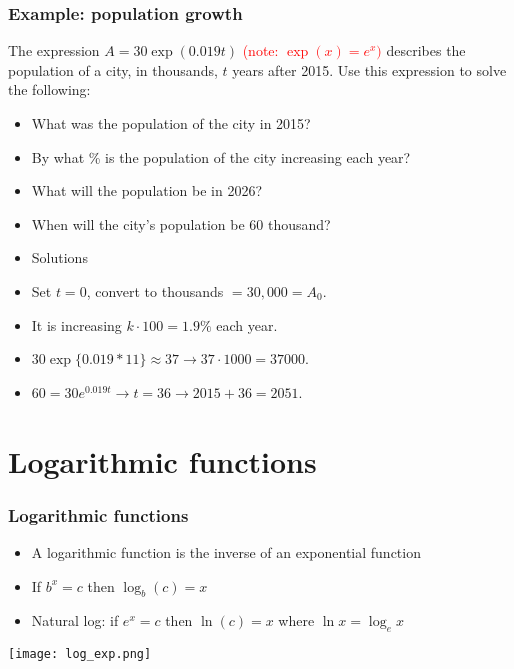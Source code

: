 \documentclass[xcolor=dvipsnames, 9pt]{beamer} %
\begin{document}
\begin{frame}
\frametitle{Example: population growth}


The expression $A=30\exp ( 0.019t )$ \textcolor{red}{(note: $\exp(x) = e^x)$} describes the population of a city, in thousands, $t$ years after 2015.  Use this expression to solve the following:

\begin{itemize}
\item What was the population of the city in 2015?
\item By what \% is the population of the city increasing each year?
\item What will the population be in 2026? 
\item When will the city’s population be 60 thousand?
\item[] Solutions
\item Set $t = 0$, convert to thousands $=30,000 = A_0$.
\item It is increasing $k \cdot 100 = 1.9\%$ each year.
\item $30\exp\{0.019*11\} \approx 37 \rightarrow 37 \cdot 1000 = 37000$.
\item $60 = 30e^{0.019t} \rightarrow t = 36 \rightarrow 2015 + 36 = 2051$.

\end{itemize}

\end{frame}

\section{Logarithmic functions}

\begin{frame}
\frametitle{Logarithmic functions}
\begin{itemize}
\item A logarithmic function is the \textcolor{dark_red}{inverse} of an exponential function 
\item If $b^x = c$ then $\log_b(c) = x$ 
\item Natural log: if $e^x = c$ then $\ln (c) = x$ where $\ln x = \log_e x$
\end{itemize}
\begin{center}
\texttt{[image: log\_exp.png]}
\end{center}
\end{frame}
\end{document}
